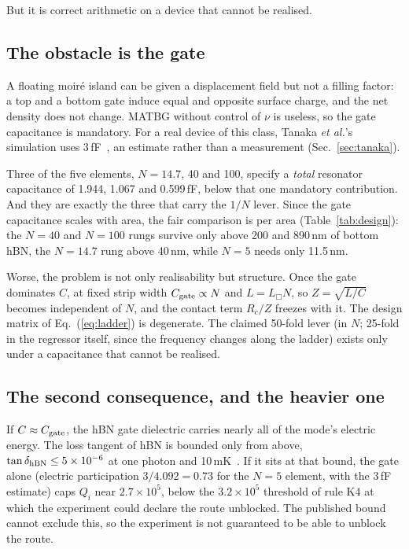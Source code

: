 \documentclass[aps,prb,reprint,superscriptaddress,longbibliography]{revtex4-2}
\begin{document}
But it is correct arithmetic on a device that cannot be realised.

\subsection{The obstacle is the gate}

A floating moir\'e island can be given a displacement field but not a
filling factor: a top and a bottom gate induce equal and opposite
surface charge, and the net density does not change. MATBG without
control of $\nu$ is useless, so the gate capacitance is mandatory. For a
real device of this class, Tanaka \emph{et al.}'s simulation uses
3\,fF~\cite{Tanaka2025}, an estimate rather than a measurement
(Sec.~\ref{sec:tanaka}).

Three of the five elements, $N = 14.7$, 40 and 100, specify a
\emph{total} resonator capacitance of 1.944, 1.067 and 0.599\,fF, below
that one mandatory contribution. And they are exactly the three that
carry the $1/N$ lever. Since the gate capacitance scales with area, the
fair comparison is per area (Table~\ref{tab:design}): the $N = 40$ and
$N = 100$ rungs survive only above 200 and 890\,nm of bottom hBN, the
$N = 14.7$ rung above 40\,nm, while $N = 5$ needs only 11.5\,nm.

Worse, the problem is not only realisability but structure. Once the
gate dominates $C$, at fixed strip width $C_{\rm gate} \propto N$ and
$L = L_\Box N$, so $Z = \sqrt{L/C}$ becomes independent of $N$, and the
contact term $R_c/Z$ freezes with it. The design matrix of
Eq.~(\ref{eq:ladder}) is degenerate. The claimed 50-fold lever (in $N$;
25-fold in the regressor itself, since the frequency changes along the
ladder) exists only under a capacitance that cannot be realised.

\subsection{The second consequence, and the heavier one}

If $C \approx C_{\rm gate}$, the hBN gate dielectric carries nearly all
of the mode's electric energy. The loss tangent of hBN is bounded only
from above, $\tan\delta_{\rm hBN} \leq 5 \times 10^{-6}$ at one photon
and 10\,mK~\cite{Wang2022}. If it sits at that bound, the gate alone
(electric participation $3/4.092 = 0.73$ for the $N = 5$ element, with
the 3\,fF estimate) caps $Q_i$ near $2.7 \times 10^{5}$, below the
$3.2 \times 10^{5}$ threshold of rule K4 at which the experiment could
declare the route unblocked. The published bound cannot exclude this,
so the experiment is not guaranteed to be able to unblock the route.
\end{document}

